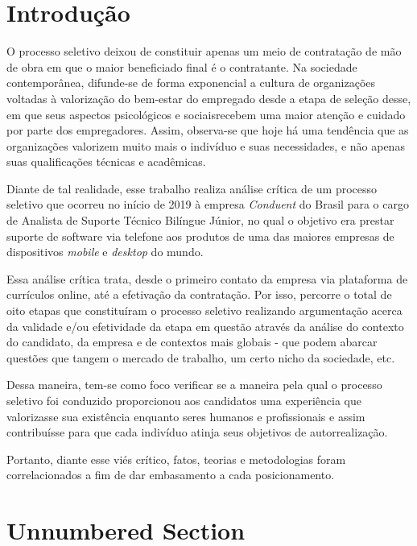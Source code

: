 \documentclass[12pt]{article}
\begin{document}
\tableofcontents


\section{Introdução}

O processo seletivo deixou de constituir apenas um meio de contratação de mão de obra em que o maior beneficiado final é o contratante. Na sociedade contemporânea, difunde-se de forma exponencial a cultura de organizações voltadas à valorização do bem-estar do empregado desde a etapa de seleção desse, em que seus aspectos psicológicos e sociaisrecebem uma maior atenção e cuidado por parte dos empregadores. Assim, observa-se que hoje há uma tendência que as organizações valorizem muito mais o indivíduo e suas necessidades, e não apenas suas qualificações técnicas e acadêmicas.

Diante de tal realidade, esse trabalho realiza análise crítica de um processo seletivo que ocorreu no início de 2019 à empresa \emph{Conduent} do Brasil para o cargo de Analista de Suporte Técnico Bilíngue Júnior, no qual o objetivo era prestar suporte de software via telefone aos produtos de uma das maiores empresas de dispositivos \emph{mobile} e \emph{desktop} do mundo.

Essa análise crítica trata, desde o primeiro contato da empresa via plataforma de currículos online, até a efetivação da contratação. Por isso, percorre o total de oito etapas que constituíram o processo seletivo realizando argumentação acerca da validade e/ou efetividade da etapa em questão através da análise do contexto do candidato, da empresa e de contextos mais globais - que podem abarcar questões que tangem o mercado de trabalho, um certo nicho da sociedade, etc.

Dessa maneira, tem-se como foco verificar se a maneira pela qual o processo seletivo foi conduzido proporcionou aos candidatos uma experiência que valorizasse sua existência enquanto seres humanos e profissionais e assim contribuísse para que cada indivíduo atinja seus objetivos de autorrealização. 

Portanto, diante esse viés crítico, fatos, teorias e metodologias foram correlacionados a fim de dar embasamento a cada posicionamento.


\section*{Unnumbered Section}
\end{document}
